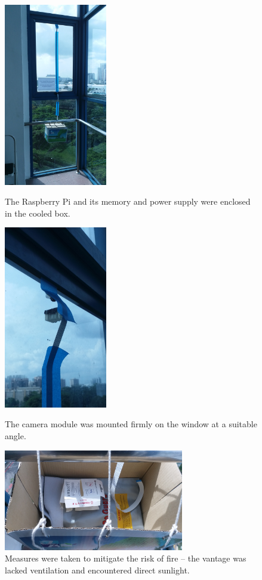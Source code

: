 \documentclass[a4paper, 11pt]{article} %
\begin{document}
		\begin{figure}[H]
			\centering
			\includegraphics[width=0.4\textwidth, angle=-90]{figures/rpi_camera_1.jpg}
			\caption{The Raspberry Pi and its memory and power supply were enclosed in the cooled box.}
			\includegraphics[width=0.4\textwidth, angle=-90]{figures/rpi_camera_2.jpg}
			\caption{The camera module was mounted firmly on the window at a suitable angle.}
			\includegraphics[width=0.7\textwidth]{figures/rpi_camera_3.jpg}
			\caption{Measures were taken to mitigate the risk of fire -- the vantage was lacked ventilation and 
			encountered direct sunlight.}
		\end{figure}
\end{document}
